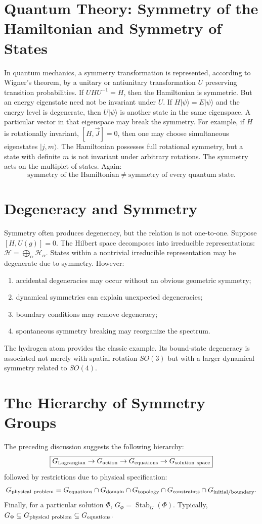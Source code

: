 \section{Quantum Theory: Symmetry of the Hamiltonian and Symmetry of States}
In quantum mechanics, a symmetry transformation is represented, according to
Wigner's theorem, by a unitary or antiunitary transformation $U$ preserving
transition probabilities.
If $UHU^{-1}=H$,
then the Hamiltonian is symmetric.
But an energy eigenstate need not be invariant under $U$.
If $H|\psi\rangle=E|\psi\rangle$ and the energy level is degenerate, 
then $U|\psi\rangle$ is another state in the same eigenspace.
A particular vector in that eigenspace may break the symmetry.
For example, if $H$ is rotationally invariant, $[H,\vec{J}]=0$,
then one may choose simultaneous eigenstates $|j,m\rangle$.
The Hamiltonian possesses full rotational symmetry, but a state with definite
$m$ is not invariant under arbitrary rotations.
The symmetry acts on the multiplet of states.
Again:
\[
\boxed{
\text{symmetry of the Hamiltonian}
\neq
\text{symmetry of every quantum state}.
}
\]

\section{ Degeneracy and Symmetry}
Symmetry often produces degeneracy, but the relation is not one-to-one.
Suppose $[H,U(g)]=0$. The Hilbert space decomposes into irreducible 
representations: $\mathcal{H}=\bigoplus_\alpha\mathcal{H}_\alpha$.
States within a nontrivial irreducible representation may be degenerate due to
symmetry.
However:
\begin{enumerate}
\item accidental degeneracies may occur without an obvious geometric symmetry;
\item dynamical symmetries can explain unexpected degeneracies;
\item boundary conditions may remove degeneracy;
\item spontaneous symmetry breaking may reorganize the spectrum.
\end{enumerate}
The hydrogen atom provides the classic example.  Its bound-state degeneracy is
associated not merely with spatial rotation $SO(3)$ but with a larger dynamical
symmetry related to $SO(4)$.

\section{ The Hierarchy of Symmetry Groups}
The preceding discussion suggests the following hierarchy:
\[\boxed{G_{\rm Lagrangian}\rightarrow G_{\rm action}\rightarrow
G_{\rm equations}\rightarrow G_{\rm solution\ space}}\]
followed by restrictions due to physical specification:
\[G_{\rm physical\ problem}=G_{\rm equations}\cap G_{\rm domain}
\cap G_{\rm topology} \cap G_{\rm constraints}\cap G_{\rm initial/boundary}.\]
Finally, for a particular solution $\Phi$, $G_\Phi=\operatorname{Stab}_G(\Phi)$.
Typically,$G_\Phi\subseteq G_{\rm physical\ problem}\subseteq G_{\rm equations}$.

